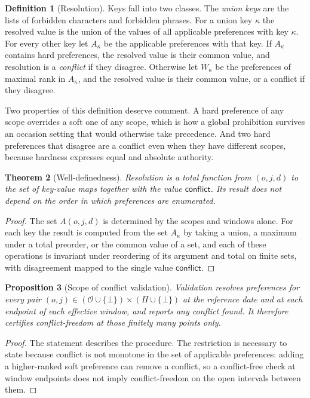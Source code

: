 \documentclass[11pt]{article}
\newtheorem{theorem}{Theorem}[section]
\newtheorem{proposition}[theorem]{Proposition}
\theoremstyle{definition}
\newtheorem{definition}[theorem]{Definition}
\theoremstyle{remark}
\begin{document}
\begin{definition}[Resolution]\label{def:resolve}
Keys fall into two classes. The \emph{union keys} are the lists of forbidden characters and forbidden phrases. For a union key $\kappa$ the resolved value is the union of the values of all applicable preferences with key $\kappa$. For every other key let $A_\kappa$ be the applicable preferences with that key. If $A_\kappa$ contains hard preferences, the resolved value is their common value, and resolution is a \emph{conflict} if they disagree. Otherwise let $W_\kappa$ be the preferences of maximal rank in $A_\kappa$, and the resolved value is their common value, or a conflict if they disagree.
\end{definition}

Two properties of this definition deserve comment. A hard preference of any scope overrides a soft one of any scope, which is how a global prohibition survives an occasion setting that would otherwise take precedence. And two hard preferences that disagree are a conflict even when they have different scopes, because hardness expresses equal and absolute authority.

\begin{theorem}[Well-definedness]\label{thm:prefs}
Resolution is a total function from $(o,j,d)$ to the set of key-value maps together with the value $\mathsf{conflict}$. Its result does not depend on the order in which preferences are enumerated.
\end{theorem}
\begin{proof}
The set $A(o,j,d)$ is determined by the scopes and windows alone. For each key the result is computed from the set $A_\kappa$ by taking a union, a maximum under a total preorder, or the common value of a set, and each of these operations is invariant under reordering of its argument and total on finite sets, with disagreement mapped to the single value $\mathsf{conflict}$.
\end{proof}

\begin{proposition}[Scope of conflict validation]\label{prop:prefcheck}
Validation resolves preferences for every pair $(o,j)\in(\mathcal{O}\cup\{\bot\})\times(\Pi\cup\{\bot\})$ at the reference date and at each endpoint of each effective window, and reports any conflict found. It therefore certifies conflict-freedom at those finitely many points only.
\end{proposition}
\begin{proof}
The statement describes the procedure. The restriction is necessary to state because conflict is not monotone in the set of applicable preferences: adding a higher-ranked soft preference can remove a conflict, so a conflict-free check at window endpoints does not imply conflict-freedom on the open intervals between them.
\end{proof}
\end{document}
